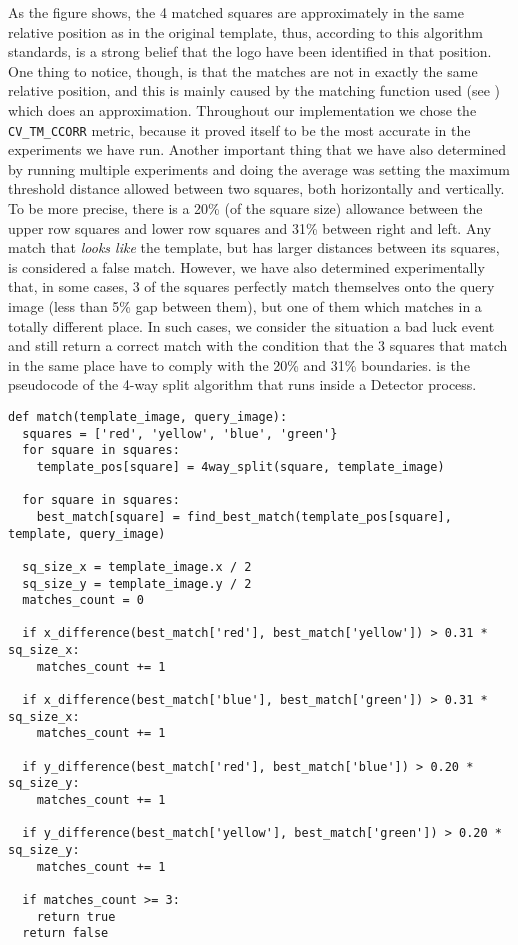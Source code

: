 As the figure shows, the 4 matched squares are approximately in the same
relative position as in the original template, thus, according to this
algorithm standards, is a strong belief that the logo have been identified in
that position. One thing to notice, though, is that the matches are not in
exactly the same relative position, and this is mainly caused by the matching
function used (see ) which
does an approximation. Throughout our implementation we chose the
\texttt{CV_TM_CCORR} metric, because it proved itself to be the most accurate
in the experiments we have run. Another important thing that we have also
determined by running multiple experiments and doing the average was setting
the maximum threshold distance allowed between two squares, both horizontally
and vertically. To be more precise, there is a 20\% (of the square size)
allowance between the upper row squares and lower row squares and 31\% between
right and left. Any match that \textit{looks like} the template, but has
larger distances between its squares, is considered a false match. However, we
have also determined experimentally that, in some cases, 3 of the squares
perfectly match themselves onto the query image (less than 5\% gap between
them), but one of them which matches in a totally different place. In such
cases, we consider the situation a bad luck event and still return a correct
match with the condition that the 3 squares that match in the same place have
to comply with the 20\% and 31\% boundaries.
 is the pseudocode of
the 4-way split algorithm that runs inside a Detector process.

\lstset{language=Python,caption=Deciding if a logo is or is not found,label=lst:4-way-alg}
\begin{lstlisting}
def match(template_image, query_image):
  squares = ['red', 'yellow', 'blue', 'green'}
  for square in squares:
    template_pos[square] = 4way_split(square, template_image)

  for square in squares:
    best_match[square] = find_best_match(template_pos[square], template, query_image)

  sq_size_x = template_image.x / 2
  sq_size_y = template_image.y / 2
  matches_count = 0

  if x_difference(best_match['red'], best_match['yellow']) > 0.31 * sq_size_x:
    matches_count += 1

  if x_difference(best_match['blue'], best_match['green']) > 0.31 * sq_size_x:
    matches_count += 1

  if y_difference(best_match['red'], best_match['blue']) > 0.20 * sq_size_y:
    matches_count += 1

  if y_difference(best_match['yellow'], best_match['green']) > 0.20 * sq_size_y:
    matches_count += 1

  if matches_count >= 3:
    return true
  return false
\end{lstlisting}

